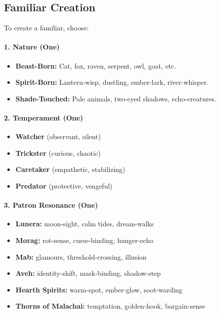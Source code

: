 \documentclass[11pt]{book}
\begin{document}
\subsection{Familiar Creation}

To create a familiar, choose:

\paragraph{1. Nature (One)}
\begin{itemize}[leftmargin=1.8em]
    \item \textbf{Beast-Born:} Cat, fox, raven, serpent, owl, goat, etc.
    \item \textbf{Spirit-Born:} Lantern-wisp, dustling, ember-lark, river-whisper.
    \item \textbf{Shade-Touched:} Pale animals, two-eyed shadows, echo-creatures.
\end{itemize}

\paragraph{2. Temperament (One)}
\begin{itemize}[leftmargin=1.8em]
    \item \textbf{Watcher} (observant, silent)  
    \item \textbf{Trickster} (curious, chaotic)  
    \item \textbf{Caretaker} (empathetic, stabilizing)  
    \item \textbf{Predator} (protective, vengeful)
\end{itemize}

\paragraph{3. Patron Resonance (One)}
\begin{itemize}[leftmargin=1.8em]
    \item \textbf{Lunera:} moon-sight, calm tides, dream-walks  
    \item \textbf{Morag:} rot-sense, curse-binding, hunger-echo  
    \item \textbf{Mab:} glamours, threshold-crossing, illusion  
    \item \textbf{Aveh:} identity-shift, mask-binding, shadow-step  
    \item \textbf{Hearth Spirits:} warm-spot, ember-glow, soot-warding  
    \item \textbf{Thorns of Malachai:} temptation, golden-hook, bargain-sense  
\end{itemize}
\end{document}
